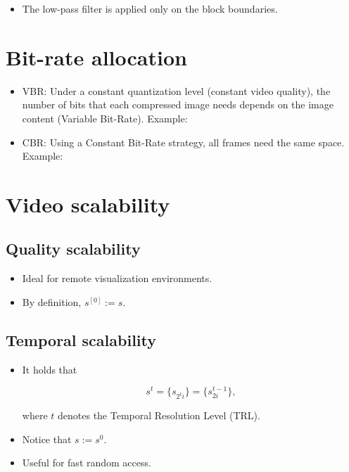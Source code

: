 {

\begin{itemize}
\tightlist
\item
  The low-pass filter is applied only on the block boundaries.
\end{itemize}

\section{Bit-rate allocation}
\begin{itemize}
\item
  VBR: Under a constant quantization level (constant video quality), the
  number of bits that each compressed image needs depends on the image
  content (Variable Bit-Rate). Example:

\item
  CBR: Using a Constant Bit-Rate strategy, all frames need the same
  space. Example:
\end{itemize}

\section{Video scalability}
\subsection{Quality scalability}
\begin{itemize}
\item
  Ideal for remote visualization environments.
\item
  By definition, $s^{[0]}:=s$.
\end{itemize}

\subsection{Temporal scalability}
\begin{itemize}
\item
  It holds that

  \begin{equation}
    s^{t}=\{s_{2^t i}\}=\{s_{2i}^{t-1}\},
  \end{equation}

  where $t$ denotes the Temporal Resolution Level (TRL).
\item
  Notice that $s:=s^{0}$.
\item
  Useful for fast random access.
\end{itemize}

}

